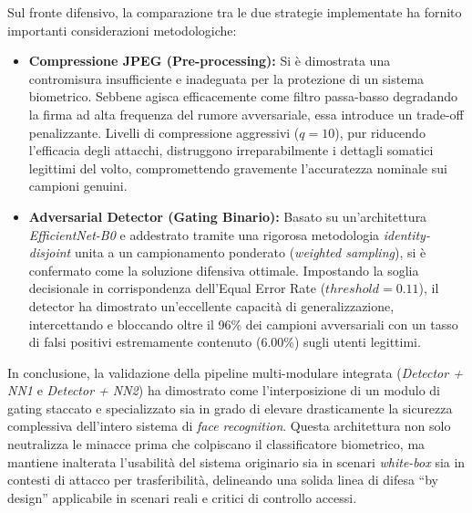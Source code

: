 \documentclass[a4paper, 12pt]{article}
\begin{document}
Sul fronte difensivo, la comparazione tra le due strategie implementate ha fornito importanti considerazioni metodologiche:
\begin{itemize}
    \item \textbf{Compressione JPEG (Pre-processing):} Si è dimostrata una contromisura insufficiente e inadeguata per 
    la protezione di un sistema biometrico. Sebbene agisca efficacemente come filtro passa-basso degradando la firma ad alta 
    frequenza del rumore avversariale, essa introduce un trade-off penalizzante. Livelli di compressione aggressivi ($q=10$), 
    pur riducendo l'efficacia degli attacchi, distruggono irreparabilmente i dettagli somatici legittimi del volto, 
    compromettendo gravemente l'accuratezza nominale sui campioni genuini.
    \item \textbf{Adversarial Detector (Gating Binario):} Basato su un'architettura \textit{EfficientNet-B0} e addestrato tramite 
    una rigorosa metodologia \textit{identity-disjoint} unita a un campionamento ponderato (\textit{weighted sampling}), si è 
    confermato come la soluzione difensiva ottimale. Impostando la soglia decisionale in corrispondenza dell'Equal Error Rate 
    ($threshold = 0.11$), il detector ha dimostrato un'eccellente capacità di generalizzazione, intercettando e bloccando oltre 
    il 96\% dei campioni avversariali con un tasso di falsi positivi estremamente contenuto (6.00\%) sugli utenti legittimi.
\end{itemize}

In conclusione, la validazione della pipeline multi-modulare integrata (\textit{Detector + NN1} e \textit{Detector + NN2}) 
ha dimostrato come l'interposizione di un modulo di gating staccato e specializzato sia in grado di elevare drasticamente 
la sicurezza complessiva dell'intero sistema di \textit{face recognition}. Questa architettura non solo neutralizza le minacce 
prima che colpiscano il classificatore biometrico, ma mantiene inalterata l'usabilità del sistema originario sia in scenari \textit{white-box} 
sia in contesti di attacco per trasferibilità, delineando una solida linea di difesa ``by design'' applicabile in scenari reali e 
critici di controllo accessi.


\clearpage




 

\end{document}
